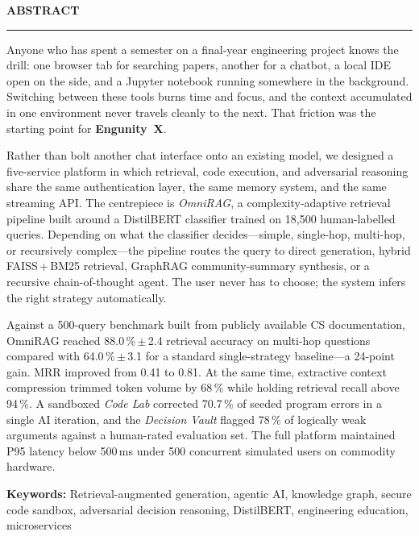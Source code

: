 \thispagestyle{empty}

\begin{center}
{\Large {\bf \uppercase{Abstract}}}
\end{center}

\vspace{\baselineskip}
\hrule
\vspace{2\baselineskip}

Anyone who has spent a semester on a final-year engineering project knows
the drill: one browser tab for searching papers, another for a chatbot, a
local IDE open on the side, and a Jupyter notebook running somewhere in the
background. Switching between these tools burns time and focus, and the
context accumulated in one environment never travels cleanly to the next.
That friction was the starting point for \textbf{Engunity~X}.

Rather than bolt another chat interface onto an existing model, we designed
a five-service platform in which retrieval, code execution, and adversarial
reasoning share the same authentication layer, the same memory system, and
the same streaming API. The centrepiece is \textit{OmniRAG}, a
complexity-adaptive retrieval pipeline built around a DistilBERT classifier
trained on 18{,}500 human-labelled queries. Depending on what the classifier
decides---simple, single-hop, multi-hop, or recursively complex---the
pipeline routes the query to direct generation, hybrid FAISS\,+\,BM25
retrieval, GraphRAG community-summary synthesis, or a recursive
chain-of-thought agent. The user never has to choose; the system infers
the right strategy automatically.

Against a 500-query benchmark built from publicly available CS documentation,
OmniRAG reached 88.0\,\%\,$\pm$\,2.4 retrieval accuracy on multi-hop
questions compared with 64.0\,\%\,$\pm$\,3.1 for a standard single-strategy
baseline---a 24-point gain. MRR improved from 0.41 to 0.81. At the same time,
extractive context compression trimmed token volume by 68\,\% while holding
retrieval recall above 94\,\%. A sandboxed \textit{Code Lab} corrected
70.7\,\% of seeded program errors in a single AI iteration, and the
\textit{Decision Vault} flagged 78\,\% of logically weak arguments against
a human-rated evaluation set. The full platform maintained P95 latency below
500\,ms under 500 concurrent simulated users on commodity hardware.

\vspace{1em}
\noindent
\textbf{Keywords:} Retrieval-augmented generation, agentic AI, knowledge
graph, secure code sandbox, adversarial decision reasoning, DistilBERT,
engineering education, microservices
